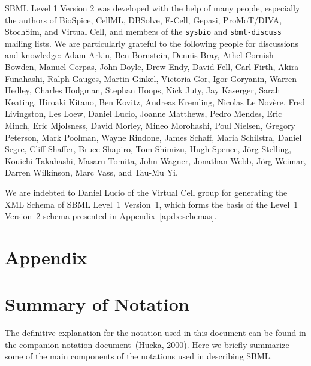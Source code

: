 \documentclass[10pt]{cekarticle}
\newcommand{\changed}[1]{\textcolor{BrickRed}{#1}}
\begin{document}
SBML Level 1 \changed{Version 2} was developed with the help of many
people, especially the authors of BioSpice, \changed{CellML}, DBSolve,
E-Cell, Gepasi, \changed{ProMoT/DIVA}, StochSim, and Virtual Cell, and
members of the \texttt{sysbio} and \texttt{sbml-discuss} mailing lists.  We
are particularly grateful to the following people for discussions and
knowledge: \changed{Adam Arkin}, \changed{Ben Bornstein}, Dennis Bray,
Athel Cornish-Bowden, \changed{Manuel Corpas}, John Doyle, \changed{Drew
  Endy}, David Fell, Carl Firth, \changed{Akira Funahashi}, \changed{Ralph
  Gauges}, Martin Ginkel, \changed{Victoria Gor}, Igor Goryanin, Warren
Hedley, \changed{Charles Hodgman}, \changed{Stephan Hoops}, \changed{Nick
  Juty}, Jay Kaserger, \changed{Sarah Keating}, Hiroaki Kitano,
\changed{Ben Kovitz}, Andreas Kremling, Nicolas Le Nov\`{e}re,
\changed{Fred Livingston}, Les Loew, Daniel Lucio, \changed{Joanne
  Matthews}, Pedro Mendes, \changed{Eric Minch}, Eric Mjolsness,
\changed{David Morley}, \changed{Mineo Morohashi}, \changed{Poul Nielsen},
\changed{Gregory Peterson}, \changed{Mark Poolman}, \changed{Wayne
  Rindone}, James Schaff, \changed{Maria Schilstra}, \changed{Daniel
  Segre}, \changed{Cliff Shaffer}, Bruce Shapiro, Tom Shimizu, Hugh Spence,
J\"{o}rg Stelling, Kouichi Takahashi, Masaru Tomita, John Wagner,
\changed{Jonathan Webb}, \changed{J\"{o}rg Weimar}, \changed{Darren
  Wilkinson}, \changed{Marc Vass}, and \changed{Tau-Mu Yi}.

We are indebted to Daniel Lucio of the Virtual Cell group for generating
the XML Schema of SBML Level~1 Version~1, which forms the basis of the
Level~1 Version~2 schema presented in Appendix~\ref{apdx:schemas}.


\newpage
\section{Appendix}
\setcounter{secnumdepth}{2}
\appendix
\section{Summary of Notation}
\label{apdx:notation}

The definitive explanation for the notation used in this document can be
found in the companion notation document~(Hucka, 2000).  Here we briefly
summarize some of the main components of the notations used in describing
SBML.
\end{document}
